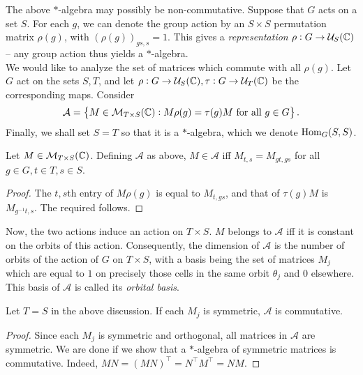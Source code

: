 	The above $*$-algebra may possibly be non-commutative. Suppose that $G$ acts on a set $S$. For each $g$, we can denote the group action by an $S \times S$ permutation matrix $\rho(g)$, with $(\rho(g))_{gs,s} = 1$. This gives a \emph{representation} $\rho : G \to \mathcal{U}_{S}(\mathbb{C})$ -- any group action thus yields a $*$-algebra.\\
	We would like to analyze the set of matrices which commute with all $\rho(g)$. Let $G$ act on the sets $S,T$, and let $\rho : G \to \mathcal{U}_S(\mathbb{C}), \tau : G \to \mathcal{U}_T(\mathbb{C})$ be the corresponding maps. Consider
	\[ \mathcal{A} = \left\{ M \in \mathcal{M}_{T \times S}(\mathbb{C}) : M \rho(g) = \tau(g) M \text{ for all $g \in G$} \right\}. \]
	Finally, we shall set $S = T$ so that it is a $*$-algebra, which we denote $\operatorname{Hom}_G(S,S)$.

	\begin{flem}
		Let $M \in \mathcal{M}_{T \times S}(\mathbb{C})$. Defining $\mathcal{A}$ as above, $M \in \mathcal{A}$ iff $M_{t,s} = M_{gt,gs}$ for all $g \in G, t \in T,s \in S$.
	\end{flem}
	\begin{proof}
		The $t,s$th entry of $M\rho(g)$ is equal to $M_{t,gs}$, and that of $\tau(g)M$ is $M_{g^{-1}t,s}$. The required follows.
	\end{proof}

	Now, the two actions induce an action on $T \times S$. $M$ belongs to $\mathcal{A}$ iff it is constant on the orbits of this action. Consequently, the dimension of $\mathcal{A}$ is the number of orbits of the action of $G$ on $T \times S$, with a basis being the set of matrices $M_j$ which are equal to $1$ on precisely those cells in the same orbit $\theta_j$ and $0$ elsewhere.\\
	This basis of $\mathcal{A}$ is called its \emph{orbital basis}.

	\begin{flem}
		\label{lem: gelfands lemma}
		Let $T = S$ in the above discussion. If each $M_j$ is symmetric, $\mathcal{A}$ is commutative.
	\end{flem}
	\begin{proof}
		Since each $M_j$ is symmetric and orthogonal, all matrices in $\mathcal{A}$ are symmetric. We are done if we show that a $*$-algebra of symmetric matrices is commutative. Indeed, $MN = (MN)^\top = N^\top M^\top = NM$.
	\end{proof}

